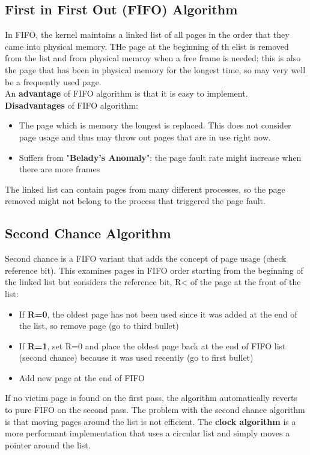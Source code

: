 \documentclass{article}
\newcommand{\bold}[1]{\textbf{#1}}
\renewcommand{\b}{\item[$\circ$]}
\newcommand{\newlist}{\begin{itemize}}
\renewcommand{\endlist}{\end{itemize}}
\begin{document}
\subsection{First in First Out (FIFO) Algorithm}

In FIFO, the kernel maintains a linked list of all pages in the order that they came into physical memory. THe page at the beginning of th elist is removed from the list and from physical memroy when a free frame is needed; this is also the page that has been in physical memory for the longest time, so may very well be a frequently used page. \\

An \bold{advantage} of FIFO algorithm is that it is easy to implement. \\ 

\bold{Disadvantages} of FIFO algorithm: \\ 
\newlist
\b The page which is memory the longest is replaced. This does not consider page usage and thus may throw out pages that are in use right now. 
\b Suffers from "\bold{Belady's Anomaly}": the page fault rate might increase when there are more frames
\endlist

The linked list can contain pages from many different processes, so the page removed might not belong to the process that triggered the page fault. 

\subsection{Second Chance Algorithm}

Second chance is a FIFO variant that adds the concept of page usage (check reference bit). This examines pages in FIFO order starting from the beginning of the linked list but considers the reference bit, R< of the page at the front of the list:

\newlist 
\b If \bold{R=0}, the oldest page has not been used since it was added at the end of the list, so remove page (go to third bullet)
\b If \bold{R=1}, set R=0 and place the oldest page back at the end of FIFO list (second chance) because it was used recently (go to first bullet)
\b Add new page at the end of FIFO
\endlist

If no victim page is found on the first pass, the algorithm automatically reverts to pure FIFO on the second pass. The problem with the second chance algorithm is that moving pages around the list is not efficient. The \bold{clock algorithm} is a more performant implementation that uses a circular list and simply moves a pointer around the list. 
\end{document}
